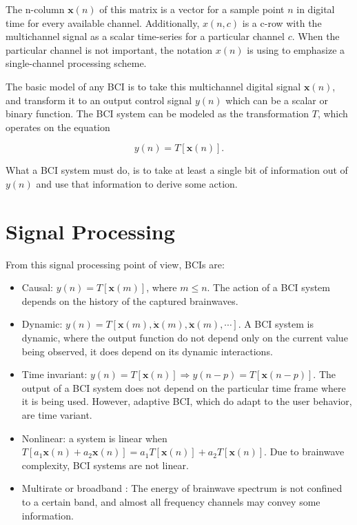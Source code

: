 The n-column $\mathbf{x}(n)$ of this matrix is a vector for a sample point $n$ in digital time for every available channel.  Additionally, $x(n,c)$  is a c-row with the multichannel signal as a scalar time-series for a particular channel $c$.  When the particular channel is not important, the notation $x(n)$ is using to emphasize a single-channel processing scheme.

The basic model of any BCI is to take this multichannel digital signal $\mathbf{x}(n)$, and transform it to an output control signal $y(n)$ which can be a scalar or binary function.  The BCI system can be modeled as the transformation $T$, which operates on the equation

\begin{equation}
y(n) = T\left[\mathbf{x}(n)\right].
\label{eq:bcimodel}
\end{equation}

What a BCI system must do, is to take at least a single bit of information out of $y(n)$ and use that information to derive some action. 

\section{Signal Processing}

From this signal processing point of view, BCIs are:

\begin{itemize}
\item Causal:  $ y(n) = T\left[  \mathbf{x}(m) \right] $, where $ m \leq n $.  The action of a BCI system depends on the history of the captured brainwaves.
\item Dynamic: $ y(n) = T\left[ \mathbf{x}(m),  \mathbf{\dot{x}}(m),\mathbf{\ddot{x}}(m), \cdots \right] $.  A BCI system is dynamic, where the output function do not depend only on the current value being observed, it does depend on its dynamic interactions.
\item Time invariant: $ y(n) = T\left[ \mathbf{x}(n) \right] \Rightarrow y(n-p) = T\left[ \mathbf{x}(n-p) \right] $.  The output of a BCI system does not depend on the particular time frame where it is being used.  However, adaptive BCI, which do adapt to the user behavior, are time variant.
\item Nonlinear: a system is linear when $T\left[ a_1 \mathbf{x}(n) + a_2 \mathbf{x}(n) \right]  = a_1 T \left[ \mathbf{x}(n) \right] + a_2 T \left[ \mathbf{x}(n) \right] $. Due to brainwave complexity, BCI systems are not linear.
\item Multirate or broadband \cite{Miller2010}:  The energy of brainwave spectrum is not confined to a certain band, and almost all frequency channels may convey some information.
\end{itemize}

